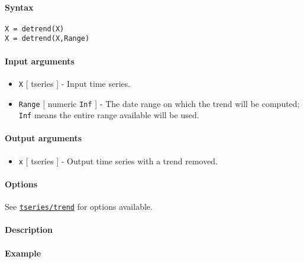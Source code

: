 


	\paragraph{Syntax}

\begin{verbatim}
X = detrend(X)
X = detrend(X,Range)
\end{verbatim}

\paragraph{Input arguments}

\begin{itemize}
\item
  \texttt{X} {[} tseries {]} - Input time series.
\item
  \texttt{Range} {[} numeric \textbar{} \texttt{Inf} {]} - The date
  range on which the trend will be computed; \texttt{Inf} means the
  entire range available will be used.
\end{itemize}

\paragraph{Output arguments}

\begin{itemize}
\itemsep1pt\parskip0pt
\item
  \texttt{x} {[} tseries {]} - Output time series with a trend removed.
\end{itemize}

\paragraph{Options}

See \href{tseries/trend}{\texttt{tseries/trend}} for options available.

\paragraph{Description}

\paragraph{Example}


